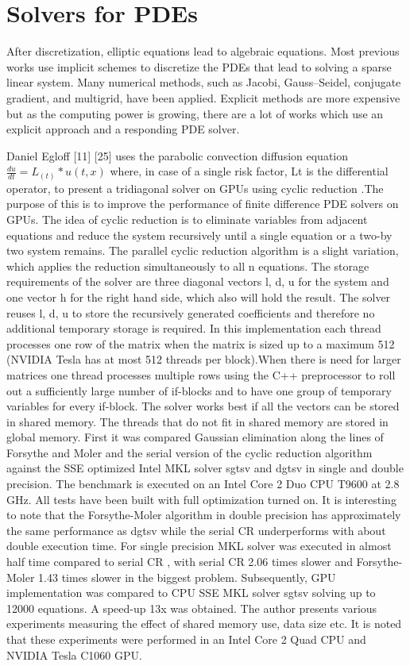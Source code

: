 \section{Solvers for PDEs}
After discretization, elliptic equations lead to algebraic equations. Most previous works use implicit schemes to discretize the PDEs that lead to solving a sparse linear system. Many numerical methods, such as Jacobi, Gauss–Seidel, conjugate gradient, and multigrid, have been applied. Explicit methods are more expensive but as the computing power is growing, there are a lot of works which use an explicit approach and a responding PDE solver.

Daniel Egloff  [11] [25] uses the parabolic convection diffusion equation $\frac{du}{dt} = L_(t )*u(t,x)$   where, in case of a single risk factor, Lt is the differential operator, to present a tridiagonal solver on GPUs using cyclic reduction .The purpose of this is to improve  the performance of  finite difference PDE solvers on GPUs. The idea of cyclic reduction is to eliminate variables from adjacent equations and reduce the system recursively until a single equation or a two-by two system remains. The parallel cyclic reduction algorithm is a slight variation, which applies the reduction simultaneously to all n equations. The storage requirements of the solver are three diagonal vectors l, d, u for the system and one vector h for the right hand side, which also will hold the result. The solver reuses l, d, u to store the recursively generated coefficients and therefore no additional temporary storage is required. In this implementation each thread processes one row of the matrix when the matrix is sized up to a maximum 512 (NVIDIA Tesla has at most 512 threads per block).When there is need for larger matrices one thread processes multiple rows using the C++ preprocessor to roll out a sufficiently large number of if-blocks and to have one group of temporary variables for every if-block. The solver works best if all the vectors can be stored in shared memory. The threads that do not fit in shared memory are stored in global memory.  First it was compared Gaussian elimination along the lines of Forsythe and Moler and the serial version of the cyclic reduction algorithm against the SSE optimized Intel MKL solver sgtsv and dgtsv in single and double precision. The benchmark is executed on an Intel Core 2 Duo CPU T9600 at 2.8 GHz. All tests have been built with full optimization turned on. It is interesting to note that the Forsythe-Moler algorithm in double precision has approximately the same performance as dgtsv while the serial CR underperforms with about double execution time. For single precision MKL solver was executed in almost half time compared to serial CR , with serial CR 2.06 times slower and Forsythe-Moler 1.43 times slower in the biggest problem. Subsequently, GPU implementation was compared to CPU SSE MKL solver sgtsv solving up to 12000 equations. A speed-up 13x was obtained. The author presents various experiments measuring the effect of shared memory use, data size etc. It is noted that these experiments were performed in an Intel Core 2 Quad CPU and NVIDIA Tesla C1060 GPU.

